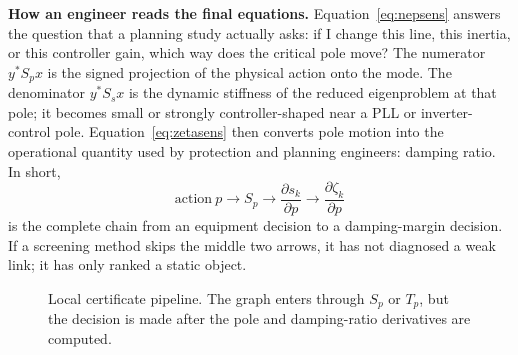 \documentclass[conference]{IEEEtran}
\begin{document}
\noindent\textbf{How an engineer reads the final equations.}
Equation~\eqref{eq:nepsens} answers the question that a planning study actually
asks: if I change this line, this inertia, or this controller gain, which way
does the critical pole move? The numerator $y^\ast S_px$ is the signed
projection of the physical action onto the mode. The denominator $y^\ast S_sx$
is the dynamic stiffness of the reduced eigenproblem at that pole; it becomes
small or strongly controller-shaped near a PLL or inverter-control pole.
Equation~\eqref{eq:zetasens} then converts pole motion into the operational
quantity used by protection and planning engineers: damping ratio. In short,
\begin{equation}
  \boxed{
  \text{action}\ p
  \longrightarrow
  S_p
  \longrightarrow
  \frac{\partial s_k}{\partial p}
  \longrightarrow
  \frac{\partial\zeta_k}{\partial p}}
  \label{eq:engineering_chain}
\end{equation}
is the complete chain from an equipment decision to a damping-margin decision.
If a screening method skips the middle two arrows, it has not diagnosed a weak
link; it has only ranked a static object.

\begin{figure}[t]
\centering
{}
\caption{Local certificate pipeline. The graph enters through $S_p$ or $T_p$,
but the decision is made after the pole and damping-ratio derivatives are
computed.}
\label{fig:certificate_pipeline}
\end{figure}
\end{document}
